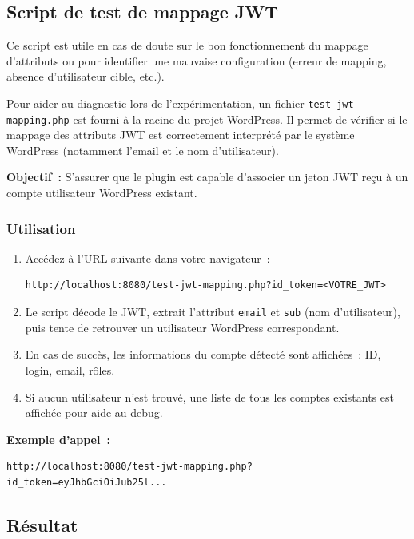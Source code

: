 \documentclass[a4paper,12pt]{article}
\begin{document}
\subsection{Script de test de mappage JWT}

Ce script est utile en cas de doute sur le bon fonctionnement du mappage d’attributs ou pour identifier une mauvaise configuration (erreur de mapping, absence d’utilisateur cible, etc.).

Pour aider au diagnostic lors de l’expérimentation, un fichier \texttt{test-jwt-mapping.php} est fourni à la racine du projet WordPress. Il permet de vérifier si le mappage des attributs JWT est correctement interprété par le système WordPress (notamment l’email et le nom d’utilisateur).

\textbf{Objectif~:} S’assurer que le plugin est capable d’associer un jeton JWT reçu à un compte utilisateur WordPress existant.

\subsubsection*{Utilisation}

\begin{enumerate}
  \item Accédez à l’URL suivante dans votre navigateur~:
  \begin{verbatim}
http://localhost:8080/test-jwt-mapping.php?id_token=<VOTRE_JWT>
  \end{verbatim}
  \item Le script décode le JWT, extrait l’attribut \texttt{email} et \texttt{sub} (nom d’utilisateur), puis tente de retrouver un utilisateur WordPress correspondant.
  \item En cas de succès, les informations du compte détecté sont affichées~: ID, login, email, rôles.
  \item Si aucun utilisateur n’est trouvé, une liste de tous les comptes existants est affichée pour aide au debug.
\end{enumerate}

\textbf{Exemple d’appel~:}

\begin{verbatim}
http://localhost:8080/test-jwt-mapping.php?id_token=eyJhbGciOiJub25l...
\end{verbatim}

\subsection*{Résultat}
\end{document}
